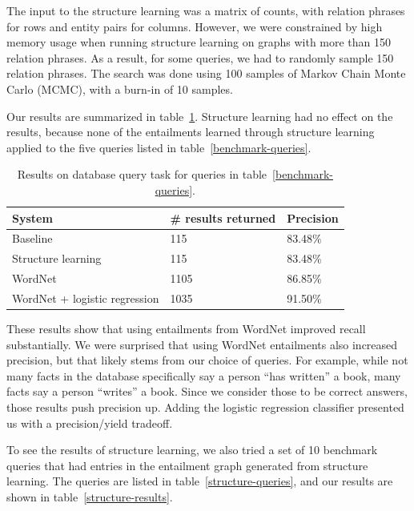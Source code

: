 \documentclass{article}
\begin{document}
The input to the structure learning was a matrix of counts, with relation phrases for rows and entity pairs for columns. However, we were constrained by high memory usage when running structure learning on graphs with more than 150 relation phrases. As a result, for some queries, we had to randomly sample 150 relation phrases. The search was done using 100 samples of Markov Chain Monte Carlo (MCMC), with a burn-in of 10 samples.

Our results are summarized in table~\ref{results}. Structure learning
had no effect on the results, because none of the entailments learned
through structure learning applied to the five queries listed in table~\ref{benchmark-queries}.

\begin{table}[h]
  \caption{Results on database query task for queries in table~\ref{benchmark-queries}.}\label{results}
  \begin{center}
    \begin{tabular}{l l l}
      \toprule
      System & \# results returned & Precision\\
      \midrule
      Baseline & 115 & 83.48\%\\
      Structure learning & 115 & 83.48\%\\
      WordNet & 1105 & 86.85\% \\
      WordNet + logistic regression & 1035 & 91.50\%\\
      \bottomrule
    \end{tabular}
  \end{center}
\end{table}

These results show that using entailments from WordNet improved recall substantially. We were surprised that using WordNet entailments also increased precision, but that likely stems from our choice of queries. For example, while not many facts in the database specifically say a person ``has written'' a book, many facts say a person ``writes'' a book. Since we consider those to be correct answers, those results push precision up. Adding the logistic regression classifier presented us with a precision/yield tradeoff.

To see the results of structure learning, we also tried a set of 10 benchmark queries that had entries in the entailment graph generated from structure learning. The queries are listed in table~\ref{structure-queries}, and our results are shown in table~\ref{structure-results}.
\end{document}
